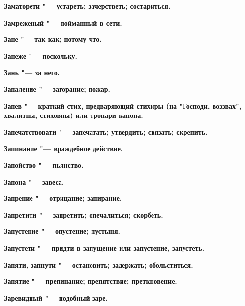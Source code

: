 \bfseries Заматорети \normalfont{} "--- устареть; зачерстветь; состариться. 




\bfseries Замреженый \normalfont{} "--- пойманный в сети. 




\bfseries Зане \normalfont{} "--- так как; потому что. 




\bfseries Занеже \normalfont{} "--- поскольку. 




\bfseries Зань \normalfont{} "--- за него. 




\bfseries Запаление \normalfont{} "--- загорание; пожар. 




\bfseries Запев \normalfont{} "--- краткий стих, предваряющий стихиры (на "Господи, воззвах", хвалитны, стиховны) или тропари канона. 




\bfseries Запечатствовати \normalfont{} "--- запечатать; утвердить; связать; скрепить. 




\bfseries Запинание \normalfont{} "--- враждебное действие. 




\bfseries Запойство \normalfont{} "--- пьянство. 




\bfseries Запона \normalfont{} "--- завеса. 




\bfseries Запрение \normalfont{} "--- отрицание; запирание. 




\bfseries Запретити \normalfont{} "--- запретить; опечалиться; скорбеть. 




\bfseries Запустение \normalfont{} "--- опустение; пустыня. 




\bfseries Запустети \normalfont{} "--- придти в запущение или запустение, запустеть. 




\bfseries Запяти, запнути \normalfont{} "--- остановить; задержать; обольститься. 




\bfseries Запятие \normalfont{} "--- препинание; препятствие; преткновение. 




\bfseries Заревидный \normalfont{} "--- подобный заре. 





